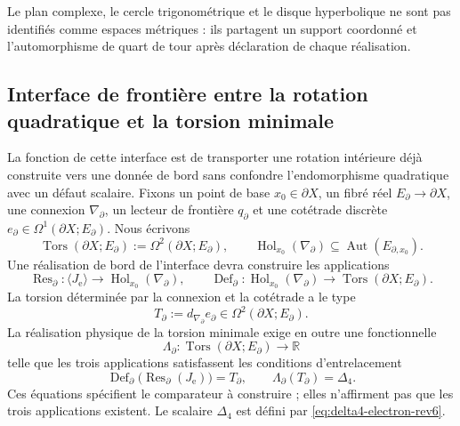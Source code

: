 Le plan complexe, le cercle trigonométrique et le disque hyperbolique ne sont pas
identifiés comme espaces métriques : ils partagent un support coordonné et
l'automorphisme de quart de tour après déclaration de chaque réalisation.

\subsection{Interface de frontière entre la rotation quadratique et la torsion minimale}
\label{p3-83-c44-s2:sec:interfaz-frontera-rotacion-torsion-minima-rev3}

La fonction de cette interface est de transporter une rotation intérieure déjà
construite vers une donnée de bord sans confondre l'endomorphisme quadratique
avec un défaut scalaire. Fixons un point de base
\(x_0\in\partial X\), un fibré réel
\(E_{\partial}\to\partial X\), une connexion \(\nabla_{\partial}\), un
lecteur de frontière \(q_{\partial}\) et une cotétrade discrète
\(e_{\partial}\in\Omega^1(\partial X;E_{\partial})\). Nous écrivons
\[
 \operatorname{Tors}(\partial X;E_{\partial})
 :=\Omega^2(\partial X;E_{\partial}),
 \qquad
 \operatorname{Hol}_{x_0}(\nabla_{\partial})
 \subseteq\operatorname{Aut}(E_{\partial,x_0}).
\]
Une réalisation de bord de l'interface devra construire les applications
\[
 \operatorname{Res}_{\partial}:
 \langle J_{\mathrm e}\rangle
 \longrightarrow\operatorname{Hol}_{x_0}(\nabla_{\partial}),
 \qquad
 \operatorname{Def}_{\partial}:
 \operatorname{Hol}_{x_0}(\nabla_{\partial})
 \longrightarrow\operatorname{Tors}(\partial X;E_{\partial}).
\]
La torsion déterminée par la connexion et la cotétrade a le type
\begin{equation}
 T_{\partial}
 :=d_{\nabla_{\partial}}e_{\partial}
 \in\Omega^2(\partial X;E_{\partial}).
 \label{p3-83-c44-s2:eq:torsion-borde-interfaz-euler-rev3}
\end{equation}
La réalisation physique de la torsion minimale exige en outre une fonctionnelle
\begin{equation}
 \Lambda_{\partial}:
 \operatorname{Tors}(\partial X;E_{\partial})\longrightarrow\mathbb R
 \label{p3-83-c44-s2:eq:funcional-borde-delta4-interfaz-rev3}
\end{equation}
telle que les trois applications satisfassent les conditions d'entrelacement
\begin{equation}
 \operatorname{Def}_{\partial}
 \bigl(\operatorname{Res}_{\partial}(J_{\mathrm e})\bigr)=T_{\partial},
 \qquad
 \Lambda_{\partial}(T_{\partial})=\Delta_4.
 \label{p3-83-c44-s2:eq:condiciones-borde-delta4-interfaz-rev3}
\end{equation}
Ces équations spécifient le comparateur à construire ; elles n'affirment pas
que les trois applications existent. Le scalaire \(\Delta_4\) est défini par
\cref{eq:delta4-electron-rev6}.

